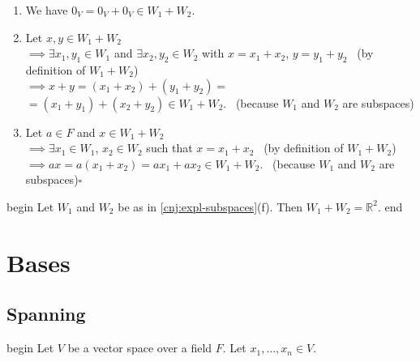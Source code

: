 \documentclass[
  12pt,
  a4paper,
  twoside]{article}
\providecommand{\tightlist}{%
  \setlength{\itemsep}{0pt}\setlength{\parskip}{0pt}}
\theoremstyle{plain}
\theoremstyle{definition}
\begin{document}
\begin{enumerate}
\def\labelenumi{(\alph{enumi})}
\tightlist
\item
  We have \(0_{V} = 0_{V} + 0_{V} \in W_{1} + W_{2}\).
\item
  Let \(x,y \in W_{1} + W_{2}\)\\
  \(\implies \exists x_{1},y_{1} \in W_{1}\) and \(\exists x_{2},y_{2} \in W_{2}\) with \(x=x_{1}+x_{2}\), \(y=y_{1}+y_{2}\)
  \hfill~{(by definition of \(W_1+W_2\))}\\
  \(\implies x + y = (x_{1}+x_{2}) + (y_{1}+y_{2}) =\)\\
  \hspace*{0.333em}\hspace*{0.333em}\hspace*{0.333em}\hspace*{0.333em}\hspace*{0.333em}\hspace*{0.333em}\(=(x_{1}+y_{1}) + (x_{2}+y_{2}) \in W_{1} + W_{2}\).
  \hfill~{(because \(W_{1}\) and \(W_{2}\) are subspaces)}
\item
  Let \(a \in F\) and \(x \in W_{1} + W_{2}\)\\
  \(\implies \exists x_{1} \in W_{1}\), \(x_{2} \in W_{2}\) such that \(x=x_{1}+x_{2}\) \hfill~{(by definition of \(W_1+W_2\))}\\
  \(\implies ax = a (x_{1}+x_{2}) = ax_{1} + ax_{2} \in W_{1} + W_{2}\).
  \hfill~{(because \(W_{1}\) and \(W_{2}\) are subspaces)\quad\(\square\)}
\end{enumerate}

\csname begin\label{cnj:expl-subspace-sumofaxes}
Let \(W_{1}\) and \(W_{2}\) be as in \ref{cnj:expl-subspaces}(f). Then \(W_{1} + W_{2} = \mathbb{R}^{2}\).
\csname end

\newpage

\hypertarget{bases}{%
\section{Bases}\label{bases}}

\hypertarget{ss-spanning}{%
\subsection{Spanning}\label{ss-spanning}}

\csname begin\label{cnj:defn-span}
Let \(V\) be a vector space over a field \(F\).
Let \(x_1, \dots, x_n \in V\).
\end{document}
